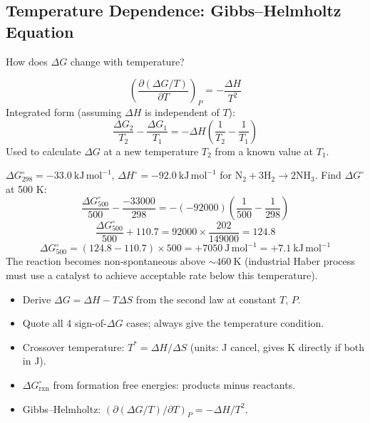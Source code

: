 \documentclass[12pt,a4paper]{article}
\begin{document}
\subsection{Temperature Dependence: Gibbs--Helmholtz Equation}
How does $\Delta G$ change with temperature?

\begin{tcolorbox}[formulabox, title={Gibbs--Helmholtz Equation}]
\[
\left(\frac{\partial(\Delta G/T)}{\partial T}\right)_P = -\frac{\Delta H}{T^2}
\]
Integrated form (assuming $\Delta H$ is independent of $T$):
\[
\frac{\Delta G_2}{T_2} - \frac{\Delta G_1}{T_1} = -\Delta H\!\left(\frac{1}{T_2} - \frac{1}{T_1}\right)
\]
Used to calculate $\Delta G$ at a new temperature $T_2$ from a known value at $T_1$.
\end{tcolorbox}

\begin{tcolorbox}[examplebox, title={Solved Example: \texorpdfstring{$\Delta G$}{Delta G} at New Temperature}]
$\Delta G^\circ_{298} = -33.0\ \mathrm{kJ\,mol^{-1}}$, $\Delta H^\circ = -92.0\ \mathrm{kJ\,mol^{-1}}$ for $\mathrm{N_2 + 3H_2 \to 2NH_3}$.
Find $\Delta G^\circ$ at 500 K:
\[
\frac{\Delta G^\circ_{500}}{500} - \frac{-33000}{298} = -(-92000)\!\left(\frac{1}{500} - \frac{1}{298}\right)
\]
\[
\frac{\Delta G^\circ_{500}}{500} + 110.7 = 92000\times\frac{202}{149000} = 124.8
\]
\[
\Delta G^\circ_{500} = (124.8 - 110.7)\times 500 = +7050\ \mathrm{J\,mol^{-1}} = +7.1\ \mathrm{kJ\,mol^{-1}}
\]
The reaction becomes non-spontaneous above $\sim 460\ \mathrm{K}$ (industrial Haber process must use a catalyst to achieve acceptable rate below this temperature).
\end{tcolorbox}

\begin{tcolorbox}[exambox, title={Exam Points (Section 2)}]
\begin{itemize}[leftmargin=*, itemsep=2pt, topsep=2pt]
  \item Derive $\Delta G = \Delta H - T\Delta S$ from the second law at constant $T$, $P$.
  \item Quote all 4 sign-of-$\Delta G$ cases; always give the temperature condition.
  \item Crossover temperature: $T^* = \Delta H/\Delta S$ (units: J cancel, gives K directly if both in J).
  \item $\Delta G^\circ_{\mathrm{rxn}}$ from formation free energies: products minus reactants.
  \item Gibbs--Helmholtz: $(\partial(\Delta G/T)/\partial T)_P = -\Delta H/T^2$.
\end{itemize}
\end{tcolorbox}
\end{document}

